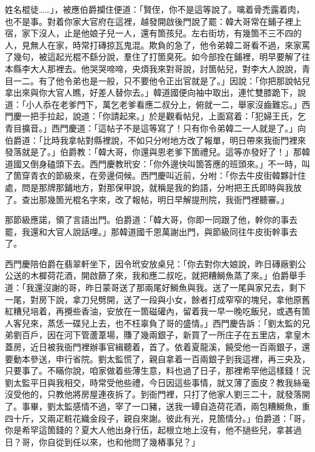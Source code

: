 姓名棍徒……」，被應伯爵攔住便道：「賢侄，你不是這等說了。噙着骨禿露着肉，也不是事。對着你家大官府在這裡，越發開啟後門說了罷：{}韓大哥常在鋪子裡上宿，家下沒人，止是他娘子兒一人，還有箇孩兒。左右街坊，有幾箇不三不四的人，見無人在家，時常打磚掠瓦鬼混。欺負的急了，他令弟韓二哥看不過，來家罵了幾句，被這起光棍不繇分說，羣住了打箇臭死。如今部拴在鋪裡，明早要解了往本縣李大人那裡去。他哭哭啼啼，央煩我來對哥說，討箇帖兒，對李大人說說，青目一二。有了他令弟也是一般，只不要他令正出官就是了。」因說：「你把那說帖兒拿出來與你大官人瞧，好差人替你去。」韓道國便向袖中取出，連忙雙膝跪下，說道：「小人忝在老爹門下，萬乞老爹看應二叔分上，俯就一二，舉家沒齒難忘。」西門慶一把手拉起，說道：「你請起來。」於是觀看帖兒，上面寫着：「犯婦王氏，乞青目擴音。」西門慶道：「這帖子不是這等寫了！只有你令弟韓二一人就是了。」向伯爵道：「比時我拿帖對縣裡說，不如只分咐地方改了報單，明日帶來我衙門裡來發落就是了。」{}伯爵教：「韓大哥，你還與恩老爹下箇禮兒。這等亦發好了！」那韓道國又倒身磕頭下去。西門慶教玳安：「你外邊快叫箇答應的班頭來。」不一時，叫了箇穿青衣的節級來，在旁邊伺候。西門慶叫近前，分咐：「你去牛皮街韓夥計住處，問是那牌那鋪地方，對那保甲說，就稱是我的鈞語，分咐把王氏即時與我放了。查出那幾箇光棍名字來，改了報帖，明日早解提刑院，我衙門裡聽審。」

那節級應諾，領了言語出門。伯爵道：「韓大哥，你即一同跟了他，幹你的事去罷，我還和大官人說話哩。」那韓道國千恩萬謝出門，與節級同往牛皮街幹事去了。

西門慶陪伯爵在翡翠軒坐下，因令玳安放桌兒：「你去對你大娘說，昨日磚廠劉公公送的木樨荷花酒，開啟篩了來，我和應二叔吃，就把糟鰣魚蒸了來。」伯爵舉手道：「我還沒謝的哥，昨日蒙哥送了那兩尾好鰣魚與我。送了一尾與家兄去，剩下一尾，對房下說，拿刀兒劈開，送了一段與小女，餘者打成窄窄的塊兒，拿他原舊紅糟兒培着，再攪些香油，安放在一箇磁礶內，留着我一早一晚吃飯兒，或遇有箇人客兒來，蒸恁一碟兒上去，也不枉辜負了哥的盛情。」西門慶告訴：「劉太監的兄弟劉百戶，因在河下管蘆葦場，賺了幾兩銀子，新買了一所庄子在五里店，拿皇木蓋房，近日被我衙門裡辦事官緝聽着，首了。依着夏龍溪，饒受他一百兩銀子，還要動本參送，申行省院。劉太監慌了，親自拿着一百兩銀子到我這裡，再三央及，只要事了。不瞞你說，咱家做着些薄生意，料也過了日子，那裡希罕他這樣錢！況劉太監平日與我相交，時常受他些禮，今日因這些事情，就又薄了面皮？{}教我絲毫沒受他的，只教他將房屋連夜拆了。到衙門裡，只打了他家人劉三二十，就發落開了。事畢，劉太監感情不過，宰了一口豬，送我一罈自造荷花酒，兩包糟鰣魚，重四十斤，又兩疋粧花織金段子，親自來謝。彼此有光，見箇情分。」伯爵道：「哥，你是希罕這箇錢的？夏大人他出身行伍，起根立地上沒有，他不撾些兒，拿甚過日？哥，你自從到任以來，也和他問了幾樁事兒？」


